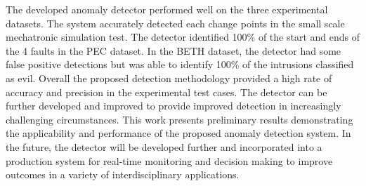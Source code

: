 The developed anomaly detector performed well on the three experimental datasets. The system accurately detected each change points in the small scale mechatronic simulation test. The detector identified 100\% of the start and ends of the 4 faults in the PEC dataset. In the BETH dataset, the detector had some false positive detections but was able to identify 100\% of the intrusions classified as evil. Overall the proposed detection methodology provided a high rate of accuracy and precision in the experimental test cases. The detector can be further developed and improved to provide improved detection in increasingly challenging circumstances. This work presents preliminary results demonstrating the applicability and performance of the proposed anomaly detection system. In the future, the detector will be developed further and incorporated into a production system for real-time monitoring and decision making to improve outcomes in a variety of interdisciplinary applications. 